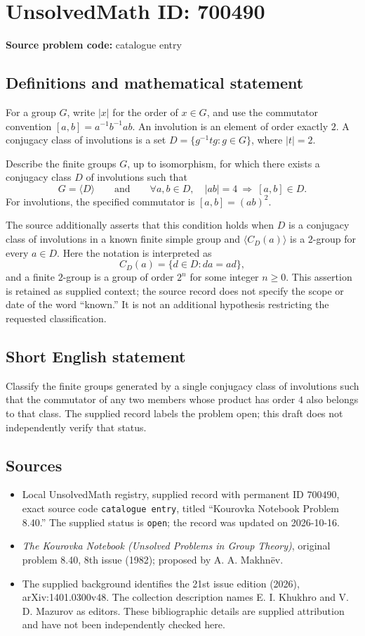 \documentclass[11pt]{article}
\begin{document}
\section*{UnsolvedMath ID: 700490}
\textbf{Source problem code:} catalogue entry
\subsection{Definitions and mathematical statement}
For a group \(G\), write \(|x|\) for the order of \(x\in G\), and use the commutator convention \([a,b]=a^{-1}b^{-1}ab\). An involution is an element of order exactly \(2\). A conjugacy class of involutions is a set \(D=\{g^{-1}tg:g\in G\}\), where \(|t|=2\).

Describe the finite groups \(G\), up to isomorphism, for which there exists a conjugacy class \(D\) of involutions such that
\[
G=\langle D\rangle
\qquad\text{and}\qquad
\forall a,b\in D,\quad |ab|=4\ \Longrightarrow\ [a,b]\in D.
\]
For involutions, the specified commutator is \([a,b]=(ab)^2\).

The source additionally asserts that this condition holds when \(D\) is a conjugacy class of involutions in a known finite simple group and \(\langle C_D(a)\rangle\) is a \(2\)-group for every \(a\in D\). Here the notation is interpreted as
\[
C_D(a)=\{d\in D:da=ad\},
\]
and a finite \(2\)-group is a group of order \(2^n\) for some integer \(n\geq 0\). This assertion is retained as supplied context; the source record does not specify the scope or date of the word ``known.'' It is not an additional hypothesis restricting the requested classification.
\subsection{Short English statement}
Classify the finite groups generated by a single conjugacy class of involutions such that the commutator of any two members whose product has order \(4\) also belongs to that class. The supplied record labels the problem open; this draft does not independently verify that status.
\subsection{Sources}
\begin{itemize}
\item Local UnsolvedMath registry, supplied record with permanent ID \(700490\), exact source code \texttt{catalogue entry}, titled ``Kourovka Notebook Problem 8.40.'' The supplied status is \texttt{open}; the record was updated on 2026-10-16.
\item \emph{The Kourovka Notebook (Unsolved Problems in Group Theory)}, original problem 8.40, 8th issue (1982); proposed by A. A. Makhn\"{e}v.
\item The supplied background identifies the 21st issue edition (2026), arXiv:1401.0300v48. The collection description names E. I. Khukhro and V. D. Mazurov as editors. These bibliographic details are supplied attribution and have not been independently checked here.
\end{itemize}
\end{document}
